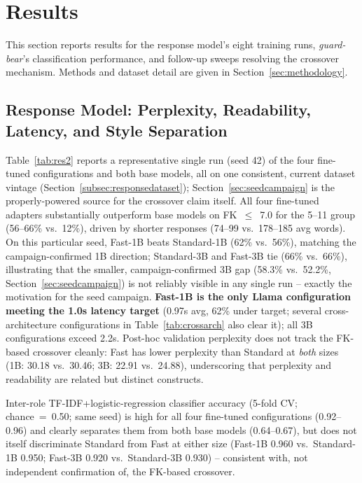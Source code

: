 \documentclass[pdflatex,sn-mathphys-num]{sn-jnl}%
\begin{document}
\section{Results}\label{sec2}

This section reports results for the response model's eight training runs, \textit{guard-bear}'s classification performance, and follow-up sweeps resolving the crossover mechanism. Methods and dataset detail are given in Section~\ref{sec:methodology}.

\subsection{Response Model: Perplexity, Readability, Latency, and Style Separation}

Table~\ref{tab:res2} reports a representative single run (seed 42) of the four fine-tuned configurations and both base models, all on one consistent, current dataset vintage (Section~\ref{subsec:responsedataset}); Section~\ref{sec:seedcampaign} is the properly-powered source for the crossover claim itself. All four fine-tuned adapters substantially outperform base models on FK~$\leq$~7.0 for the 5--11 group (56--66\% vs.\ 12\%), driven by shorter responses (74--99 vs.\ 178--185 avg words). On this particular seed, Fast-1B beats Standard-1B (62\% vs.\ 56\%), matching the campaign-confirmed 1B direction; Standard-3B and Fast-3B tie (66\% vs.\ 66\%), illustrating that the smaller, campaign-confirmed 3B gap (58.3\% vs.\ 52.2\%, Section~\ref{sec:seedcampaign}) is not reliably visible in any single run -- exactly the motivation for the seed campaign. \textbf{Fast-1B is the only Llama configuration meeting the 1.0s latency target} (0.97s avg, 62\% under target; several cross-architecture configurations in Table~\ref{tab:crossarch} also clear it); all 3B configurations exceed 2.2s. Post-hoc validation perplexity does not track the FK-based crossover cleanly: Fast has lower perplexity than Standard at \emph{both} sizes (1B: 30.18 vs.\ 30.46; 3B: 22.91 vs.\ 24.88), underscoring that perplexity and readability are related but distinct constructs.

Inter-role TF-IDF+logistic-regression classifier accuracy (5-fold CV; chance~=~0.50; same seed) is high for all four fine-tuned configurations (0.92--0.96) and clearly separates them from both base models (0.64--0.67), but does not itself discriminate Standard from Fast at either size (Fast-1B 0.960 vs.\ Standard-1B 0.950; Fast-3B 0.920 vs.\ Standard-3B 0.930) -- consistent with, not independent confirmation of, the FK-based crossover.
\end{document}
